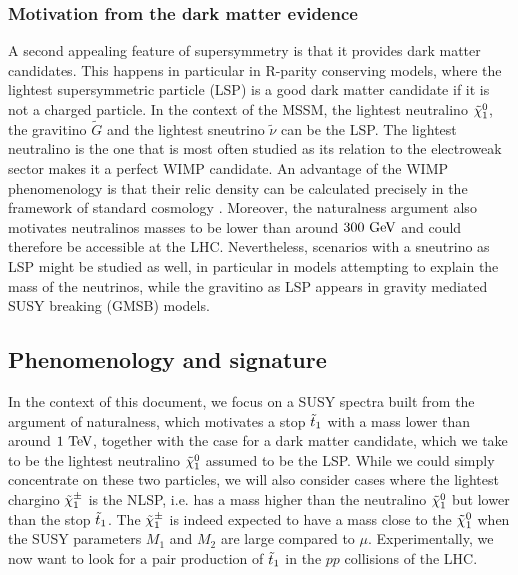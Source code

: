         \subsubsection{Motivation from the dark matter evidence}

        A second appealing feature of supersymmetry is that it provides dark matter
        candidates. This happens in particular in R-parity conserving models, where the
        lightest supersymmetric particle (LSP) is a good dark matter candidate if it is
        not a charged particle. In the context of the MSSM, the lightest neutralino
        $\tilde{\chi}_1^0$, the gravitino $\tilde{G}$ and the lightest sneutrino $\tilde{\nu}$
        can be the LSP. The lightest neutralino is the one that is most often studied as its
        relation to the electroweak sector makes it a perfect WIMP candidate.
        An advantage of the WIMP phenomenology is that their relic density can be calculated
        precisely in the framework of standard cosmology \cite{EllisDarkMatter}.
        Moreover, the naturalness argument also motivates neutralinos masses to be lower
        than around $300 ~\text{GeV}$ and could therefore be accessible at the LHC. Nevertheless,
        scenarios with a sneutrino as LSP might be
        studied as well, in particular in models attempting to explain the mass of the
        neutrinos, while the gravitino as LSP appears in gravity mediated SUSY breaking (GMSB) models.

        \subsection{Phenomenology and signature \label{sec:phenoAndSignature}}

        In the context of this document, we focus on a SUSY spectra built from the
        argument of naturalness, which motivates a stop $\tilde{t}_1$ with a mass lower than around
        $1~\text{TeV}$, together with the case for a dark matter candidate, which we take to be the
        lightest neutralino $\tilde{\chi}_1^0$ assumed to be the LSP. While we could simply concentrate on these
        two particles, we will also consider cases where the lightest chargino $\tilde{\chi}_1^\pm$
        is the NLSP, i.e. has a mass higher than the neutralino $\tilde{\chi}_1^0$ but lower
        than the stop $\tilde{t}_1$. The $\tilde{\chi}_1^\pm$ is indeed expected to have a mass close
        to the $\tilde{\chi}_1^0$ when the SUSY parameters $M_1$ and $M_2$ are large
        compared to $\mu$. Experimentally, we now want to look for a pair production of
        $\tilde{t}_1$ in the $pp$ collisions of the LHC.

